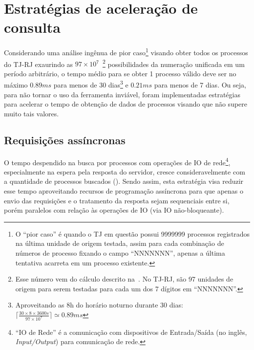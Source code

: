 \section{Estratégias de aceleração de consulta}

Considerando uma análise ingênua de pior caso\footnote{O ``pior caso'' é quando
o TJ em questão possui 9999999 processos registrados na última unidade de
origem testada, assim para cada combinação de números de processo fixando o
campo ``NNNNNNN'', apenas a última tentativa acarreta em um processo
existente.} visando obter todos os processos do TJ-RJ exaurindo as $97
\times 10^{7}$~\footnote{Esse número vem do cálculo descrito
na~. No TJ-RJ, são 97 unidades de origem
para serem testadas para cada um dos 7 dígitos em ``NNNNNNN''.} possibilidades
da numeração unificada em um período arbitrário, o tempo médio para se obter 1
processo válido deve ser no máximo $0.89ms$ para menos de 30
dias\footnote{Aproveitando as 8h do horário noturno durante 30 dias: $\lceil
\frac{30 \times 8 \times 3600s}{97 \times 10^7} \rceil \simeq 0.89ms$} e
$0.21ms$ para menos de 7 dias. Ou seja, para não tornar o uso da ferramenta
inviável, foram implementadas estratégias para acelerar o tempo de obtenção de
dados de processos visando que não supere muito tais valores.

\subsection{Requisições assíncronas~\label{sub:requisições-assíncronas}}

O tempo despendido na busca por processos com operações de IO de
rede\footnote{``IO de Rede'' é a comunicação com dispositivos de Entrada/Saída
(no inglês, \textit{Input/Output}) para comunicação de rede.}, especialmente na
espera pela resposta do servidor, cresce consideravelmente com a quantidade de
processos buscados (). Sendo assim, esta
estratégia visa reduzir esse tempo aproveitando recursos de programação
assíncrona para que apenas o envio das requisições e o tratamento da resposta
sejam sequenciais entre si, porém paralelos com relação às operações de IO (via
IO não-bloqueante).

